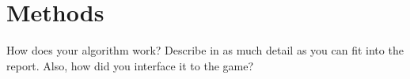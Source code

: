 \section{Methods}
\label{04}

How does your algorithm work? Describe in as much detail as you can fit into the report. Also, how did you interface it to the game?